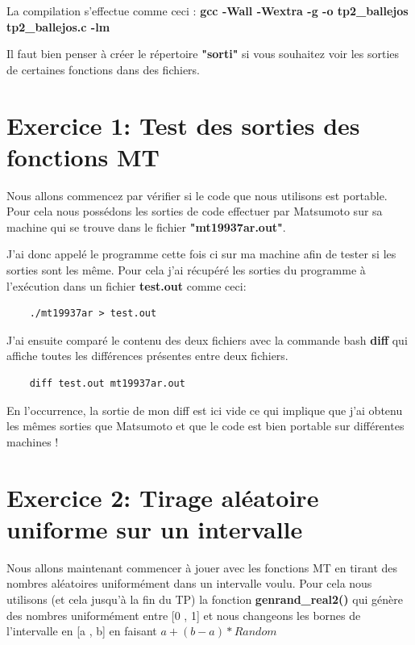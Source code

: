 \documentclass[12pt,french]{article} %
\begin{document}
\bigskip

La compilation s'effectue comme ceci : \textbf{gcc -Wall -Wextra -g -o tp2\_ballejos tp2\_ballejos.c -lm}

\bigskip

Il faut bien penser à créer le répertoire \textbf{"sorti"} si vous souhaitez voir les sorties de certaines fonctions dans des fichiers.


\newpage

\section{Exercice 1: Test des sorties des fonctions MT}

Nous allons commencez par vérifier si le code que nous utilisons est portable. Pour cela nous possédons les sorties de code effectuer par Matsumoto sur sa machine qui se trouve dans le fichier \textbf{"mt19937ar.out"}.

J'ai donc appelé le programme cette fois ci sur ma machine afin de tester si les sorties sont les même. Pour cela j'ai récupéré les sorties du programme à l'exécution dans un fichier \textbf{test.out} comme ceci:

\begin{lstlisting}
	./mt19937ar > test.out
\end{lstlisting}

\bigskip

J'ai ensuite comparé le contenu des deux fichiers avec la commande bash \textbf{diff} qui affiche toutes les différences présentes entre deux fichiers.

\begin{lstlisting}
	diff test.out mt19937ar.out
\end{lstlisting}

\bigskip

En l'occurrence, la sortie de mon diff est ici vide ce qui implique que j'ai obtenu les mêmes sorties que Matsumoto et que le code est bien portable sur différentes machines !


\section{Exercice 2: Tirage aléatoire uniforme sur un intervalle}

Nous allons maintenant commencer à jouer avec les fonctions MT en tirant des nombres aléatoires uniformément dans un intervalle voulu. Pour cela nous utilisons (et cela jusqu'à la fin du TP) la fonction \textbf{genrand\_real2()} qui génère des nombres uniformément entre [0 , 1] et nous changeons les bornes de l'intervalle en [a , b] en faisant $a + (b - a) * Random$
\end{document}
